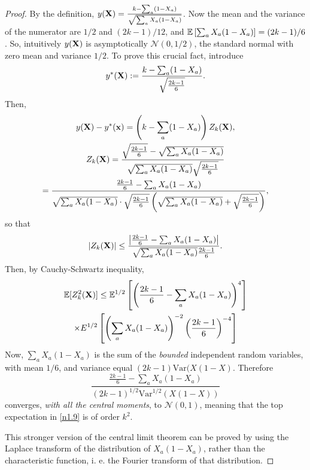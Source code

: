 \documentclass[11pt]{amsart}
\theoremstyle{remark}
\numberwithin{equation}{section}
\begin{document}
\begin{proof}
By the definition, $y(\bold X)=\frac{k-\sum_a(1-X_a)}{\sqrt{\sum_a X_a(1-X_a)}}$.
Now the mean and the variance of the numerator are $1/2$ and $(2k-1)/12$, and $\Bbb E\left[\sum_a X_a(1-X_a)
\right]=(2k-1)/6$. So, intuitively $y(\bold X)$ is asymptotically $\mathcal N(0,1/2)$, the standard normal with zero mean and variance $1/2$.
To prove this crucial fact, introduce 
\begin{equation}\label{n1.89}
y^*(\bold X):=\frac{k-\sum_a(1-X_a)}{\sqrt{\frac{2k-1}{6}}}.
\end{equation}
Then, 
\begin{multline}\label{n1.85}
y(\bold X)-y^*(\bold x)=\left(k-\sum_a(1-X_a)\right)Z_k(\bold X),\\
Z_k(\bold X)=\frac{\sqrt{\frac{2k-1}{6}}-\sqrt{\sum_a X_a(1-X_a)}}{\sqrt{\sum_a X_a(1-X_a)}\sqrt{\frac{2k-1}{6}}}\\
=\frac{\frac{2k-1}{6}-\sum_a X_a(1-X_a)}
{\sqrt{\sum_a X_a(1-X_a)}\cdot \sqrt{\frac{2k-1}{6}}\left(\sqrt{\sum_a X_a(1-X_a)}+\sqrt{\frac{2k-1}{6}}\right)},\\
\end{multline}
so that 
\[
|Z_k(\bold X)|\le \frac{\left|\frac{2k-1}{6}-\sum_a X_a(1-X_a)\right|}
{\sqrt{\sum_a X_a(1-X_a)}\frac{2k-1}{6}}.
\]
Then, by Cauchy-Schwartz inequality,
\begin{multline}\label{n1.9}
\Bbb E[Z_k^2(\bold X)]\le \Bbb E^{1/2}\left[\left(\frac{2k-1}{6}-\sum_aX_a(1-X_a)\right)^4\right]\\
\times E^{1/2}\left[\left(\sum_a X_a(1-X_a)\right)^{-2}\left(\frac{2k-1}{6}\right)^{-4}\right]\\
\end{multline}
Now, $\sum_a X_a(1-X_a)$ is the sum of the {\it bounded\/} independent random variables, with mean $1/6$, and variance equal $(2k-1)\text{Var}(X(1-X)$. Therefore 
\[
\frac{\frac{2k-1}{6}-\sum_aX_a(1-X_a)}{(2k-1)^{1/2}\text{Var}^{1/2}(X(1-X))}
\]
converges, {\it with all the central moments\/}, to $\mathcal N(0,1)$, meaning that the top expectation in \eqref{n1.9}  is of order $k^2$.

This stronger version of the central limit theorem can be proved by using the Laplace transform of the distribution of $X_a(1-X_a)$, rather than the characteristic function, i. e. the Fourier transform of that distribution.


\end{proof}
\end{document}
